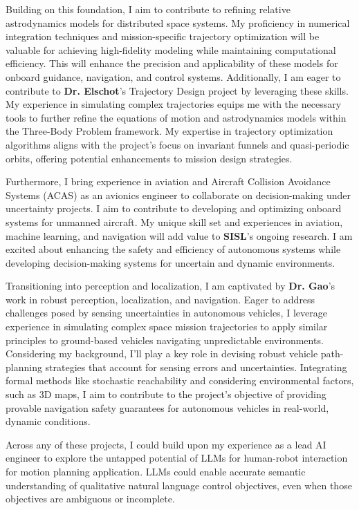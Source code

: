\documentclass[a4,20pt]{article}
\begin{document}
\begin{large}
Building on this foundation, I aim to contribute to refining relative astrodynamics models for distributed space systems. My proficiency in numerical integration techniques and mission-specific trajectory optimization will be valuable for achieving high-fidelity modeling while maintaining computational efficiency. This will enhance the precision and applicability of these models for onboard guidance, navigation, and control systems. Additionally, I am eager to contribute to \textbf{Dr. Elschot}’s Trajectory Design project by leveraging these skills. My experience in simulating complex trajectories equips me with the necessary tools to further refine the equations of motion and astrodynamics models within the Three-Body Problem framework. My expertise in trajectory optimization algorithms aligns with the project's focus on invariant funnels and quasi-periodic orbits, offering potential enhancements to mission design strategies.

Furthermore, I bring experience in aviation and Aircraft Collision Avoidance Systems (ACAS) as an avionics engineer to collaborate on decision-making under uncertainty projects. I aim to contribute to developing and optimizing onboard systems for unmanned aircraft. My unique skill set and experiences in aviation, machine learning, and navigation will add value to \textbf{SISL}’s ongoing research. I am excited about enhancing the safety and efficiency of autonomous systems while developing decision-making systems for uncertain and dynamic environments.


Transitioning into perception and localization, I am captivated by \textbf{Dr. Gao}'s work in robust perception, localization, and navigation. Eager to address challenges posed by sensing uncertainties in autonomous vehicles, I leverage experience in simulating complex space mission trajectories to apply similar principles to ground-based vehicles navigating unpredictable environments. Considering my background, I’ll play a key role in devising robust vehicle path-planning strategies that account for sensing errors and uncertainties. Integrating formal methods like stochastic reachability and considering environmental factors, such as 3D maps, I aim to contribute to the project's objective of providing provable navigation safety guarantees for autonomous vehicles in real-world, dynamic conditions.

Across any of these projects, I could build upon my experience as a lead AI engineer to explore the untapped potential of LLMs for human-robot interaction for motion planning application. LLMs could enable accurate semantic understanding of qualitative natural language control objectives, even when those objectives are ambiguous or incomplete.


\end{large}
\end{document}
